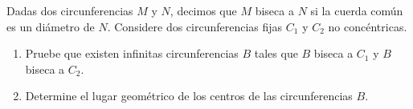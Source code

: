Dadas dos circunferencias $M$ y $N$, decimos que $M$ biseca a $N$ si la cuerda común es un diámetro de $N$. \newline 
Considere dos circunferencias fijas $C_1$ y $C_2$ no concéntricas.
 \begin{enumerate} 
   \item  Pruebe que existen infinitas circunferencias $B$ tales que $B$ biseca a $C_1$ y $B$ biseca a $C_2$.
   \item  Determine el lugar geométrico de los centros de las circunferencias $B$.
 \end{enumerate} 


